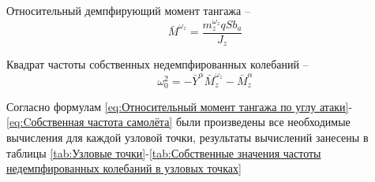     Относительный демпфирующий момент тангажа --
    \begin{equation}
        \label{eq:Относительный демпфирующий момент тангажа}
        \bar{M}^{\omega_z}=\frac{m_z^{\omega_z} qS b_a}{J_z}
    \end{equation}
    
    
    Квадрат частоты собственных недемпфированных колебаний --
    \begin{equation}
        \label{eq:Cобственная частота самолёта}
        \omega_0^2=-\bar{Y}^\alpha \bar{M}_z^{\omega_z}-\bar{M}_z^{\alpha}
    \end{equation}
    
    Согласно формулам \ref{eq:Относительный момент тангажа по углу атаки}-\ref{eq:Cобственная частота самолёта} были произведены все необходимые вычисления для каждой узловой точки, результаты вычислений занесены в таблицы \ref{tab:Узловые точки}-\ref{tab:Собственные значения частоты недемпфированных колебаний в узловых точках}


